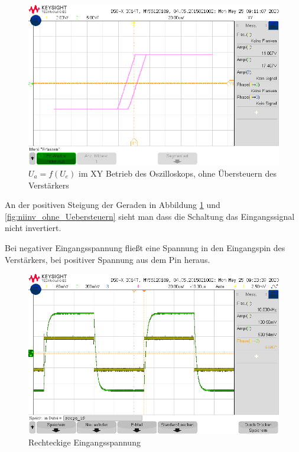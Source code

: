 \begin{figure}[H]
    \centering
    \includegraphics[width=\costumPicWidth]{Lab_1/Messungen/niinv_verst/xy_mit_uebersteuern_1.png}
    \caption{$U_a = f(U_e)$ im XY Betrieb des Oszilloskops, ohne Übersteuern des Verstärkers}
    \label{fig:niinv_mit_Uebersteuern}
\end{figure}
An der positiven Steigung der Geraden in Abbildung \ref{fig:niinv_mit_Uebersteuern} und \ref{fig:niinv_ohne_Uebersteuern} sieht man dass die Schaltung das Eingangssignal nicht invertiert.

Bei negativer Eingangsspannung fließt eine Spannung in den Eingangspin des Verstärkers, bei positiver Spannung aus dem Pin heraus. 
\begin{figure}[H]
    \centering
    \includegraphics[width=\costumPicWidth]{Lab_1/Messungen/niinv_verst/square.png}
    \caption{Rechteckige Eingangsspannung}
    \label{fig:niinv_rechteck}
\end{figure}

